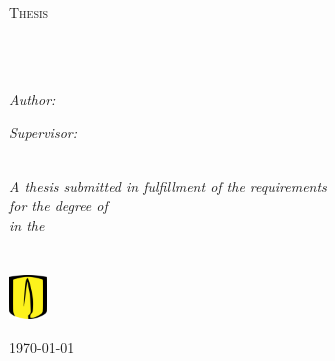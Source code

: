 \documentclass[
12pt, %
oneside, %
english, %
onehalfspacing, %
headsepline, %
]{Structural} %
\author{Juan \textsc{Vargas}} %
\begin{document}
\frontmatter %

\pagestyle{plain} %


\begin{titlepage}
\begin{center}

\vspace*{.06\textheight}
{\scshape\LARGE \univname\par}\vspace{1.5cm} %
\textsc{\Large Thesis}\\[0.5cm] %

\HRule \\[0.3cm] %
{\huge \bfseries \ttitle\par}\vspace{0.3cm} %
\HRule \\[1.4cm] %
 
\begin{minipage}[t]{0.3\textwidth}
\begin{flushleft} \large
\emph{Author:}\\
{\authorname} %
\end{flushleft}
\end{minipage}
\begin{minipage}[t]{0.3\textwidth}
\begin{flushright} \large
\emph{Supervisor:} \\
{\supname} %
\end{flushright}
\end{minipage}\\[2cm]
 

\large \textit{A thesis submitted in fulfillment of the requirements\\ for the degree of \degreename}\\[0.3cm] %
\textit{in the}\\[0.3cm]
\groupname\\\deptname\\[2cm] %
 
\includegraphics[width=0.075\textwidth]{Logo.png} %
 
{\large \today}\\[2.7cm] %

\vfill
\end{center}
\end{titlepage}
\end{document}
